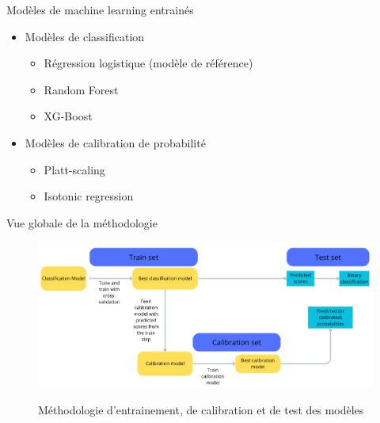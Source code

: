 \documentclass{beamer}
\begin{document}
\begin{frame}{Modèles de machine learning entrainés}

\begin{itemize}
    \item Modèles de classification
    \begin{itemize}
        \item Régression logistique (modèle de référence)
        \item Random Forest
        \item XG-Boost
    \end{itemize}
    \item Modèles de calibration de probabilité
    \begin{itemize}
        \item Platt-scaling
        \item Isotonic regression
    \end{itemize}
\end{itemize}
    
\end{frame}


\begin{frame}{Vue globale de la méthodologie}
\begin{figure}[h]
    \centering
    \includegraphics[width=1\textwidth]{Methodology.png}\\
    \caption{Méthodologie d'entrainement, de calibration et de test des modèles}
    \label{fig:Methodogoly}
\end{figure}
\end{frame}
\end{document}
